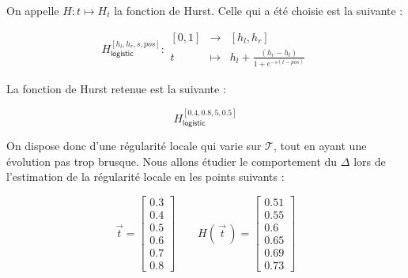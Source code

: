\begin{minipage}{0.47\linewidth}
	On appelle $H : t \mapsto H_t$ la fonction de Hurst. Celle qui a été choisie est la suivante :

	\begin{equation*}
		H^{[h_l, h_r, s, pos]}_{\textsf{logistic}} : \begin{array}{ccc}
			[0,1] & \longrightarrow & [h_l, h_r]
			\\
			t     & \longmapsto     & h_l + \frac{(h_r - h_l)}{1 + e^{-s(t - pos)}}
		\end{array}
	\end{equation*}

	La fonction de Hurst retenue est la suivante : 
	
	\begin{equation*}
		H^{[0.4, 0.8, 5, 0.5]}_{\textsf{logistic}}
	\end{equation*}

	On dispose donc d'une régularité locale qui varie sur $\mathcal T$, tout en ayant une évolution pas trop brusque. Nous allons étudier le comportement du $\Delta$ lors de l'estimation de la régularité locale en les points suivants :

	\begin{equation*}
		\vec t = \begin{bmatrix} 0.3 \\ 0.4 \\ 0.5 \\ 0.6 \\ 0.7 \\ 0.8 \end{bmatrix}
		\quad\quad
		H(\, \vec t \,) =
		\begin{bmatrix}
			0.51 \\ 0.55 \\ 0.6 \\ 0.65 \\ 0.69 \\ 0.73
		\end{bmatrix}
	\end{equation*}

\end{minipage}
\hfill
